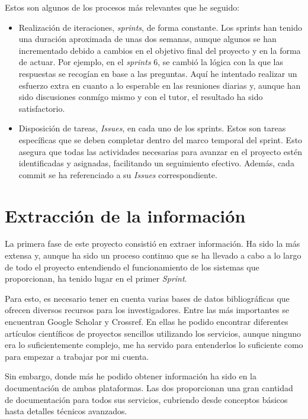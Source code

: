 Estos son algunos de los procesos más relevantes que he seguido:

\begin{itemize}
\item Realización de iteraciones, \textit{sprints}, de forma constante. Los sprints han tenido una duración aproximada de unas dos semanas, aunque algunos se han incrementado debido a cambios en el objetivo final del proyecto y en la forma de actuar. Por ejemplo, en el \textit{sprints} 6, se cambió la lógica con la que las respuestas se recogían en base a las preguntas. Aquí he intentado realizar un esfuerzo extra en cuanto a lo esperable en las reuniones diarias y, aunque han sido discusiones conmígo mismo y con el tutor, el resultado ha sido satisfactorio. 
\item Disposición de tareas, \textit{Issues}, en cada uno de los sprints. Estos son tareas específicas que se deben completar dentro del marco temporal del sprint. Esto asegura que todas las actividades necesarias para avanzar en el proyecto estén identificadas y asignadas, facilitando un seguimiento efectivo. Además, cada commit se ha referenciado a su \textit{Issues} correspondiente. 
    
\end{itemize}

\section{Extracción de la información}\label{Metodologías}

La primera fase de este proyecto consistió en extraer información. Ha sido la más extensa y, aunque ha sido un proceso continuo que se ha llevado a cabo a lo largo de todo el proyecto entendiendo el funcionamiento de los sistemas que proporcionan, ha tenido lugar en el primer \textit{Sprint}.

Para esto, es necesario tener en cuenta varias bases de datos bibliográficas que ofrecen diversos recursos para los investigadores. Entre las más importantes se encuentran Google Scholar  y Crossref. En ellas he podido encontrar diferentes artículos científicos de proyectos sencillos utilizando los servicios, aunque ninguno era lo suficientemente complejo, me ha servido para entenderlos lo suficiente como para empezar a trabajar por mi cuenta. 

Sin embargo, donde más he podido obtener información ha sido en la documentación de ambas plataformas. Las dos proporcionan una gran cantidad de documentación para todos sus servicios, cubriendo desde conceptos básicos hasta detalles técnicos avanzados.

